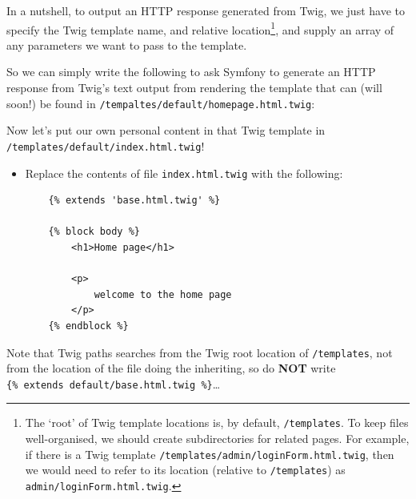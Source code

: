 \documentclass[a4paperpaper,openright]{book}
\newenvironment{Shaded}{}{}
\newcommand{\CommentTok}[1]{\textcolor[rgb]{0.38,0.63,0.69}{\textit{#1}}}
\newcommand{\KeywordTok}[1]{\textcolor[rgb]{0.00,0.44,0.13}{\textbf{#1}}}
\newcommand{\NormalTok}[1]{#1}
\newcommand{\OtherTok}[1]{\textcolor[rgb]{0.00,0.44,0.13}{#1}}
\newcommand{\StringTok}[1]{\textcolor[rgb]{0.25,0.44,0.63}{#1}}
\begin{document}
In a nutshell, to output an HTTP response generated from Twig, we just
have to specify the Twig template name, and relative location\footnote{The
  `root' of Twig template locations is, by default, \texttt{/templates}.
  To keep files well-organised, we should create subdirectories for
  related pages. For example, if there is a Twig template
  \texttt{/templates/admin/loginForm.html.twig}, then we would need to
  refer to its location (relative to \texttt{/templates}) as
  \texttt{admin/loginForm.html.twig}. }, and supply an array of any
parameters we want to pass to the template.

So we can simply write the following to ask Symfony to generate an HTTP
response from Twig's text output from rendering the template that can
(will soon!) be found in \texttt{/tempaltes/default/homepage.html.twig}:

\begin{Shaded}
\end{Shaded}

Now let's put our own personal content in that Twig template in
\texttt{/templates/default/index.html.twig}!

\begin{itemize}
\item
  Replace the contents of file \texttt{index.html.twig} with the
  following:

\begin{verbatim}
    {% extends 'base.html.twig' %}

    {% block body %}
        <h1>Home page</h1>

        <p>
            welcome to the home page
        </p>
    {% endblock %}
\end{verbatim}
\end{itemize}

Note that Twig paths searches from the Twig root location of
\texttt{/templates}, not from the location of the file doing the
inheriting, so do \textbf{NOT} write
\texttt{\{\%\ extends\ \textquotesingle{}default/base.html.twig\textquotesingle{}\ \%\}}\ldots{}
\end{document}
